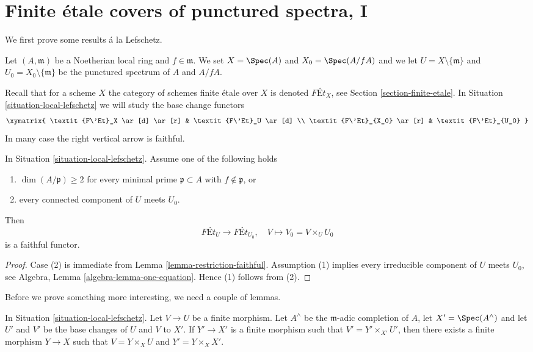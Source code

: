 \section{Finite \'etale covers of punctured spectra, I}
\label{section-pi1-punctured-spec}

\noindent
We first prove some results \'a la Lefschetz.

\begin{situation}
\label{situation-local-lefschetz}
Let $(A, \mathfrak m)$ be a Noetherian local ring and $f \in \mathfrak m$.
We set $X = \Spec(A)$ and $X_0 = \Spec(A/fA)$ and we
let $U = X \setminus \{\mathfrak m\}$ and
$U_0 = X_0 \setminus \{\mathfrak m\}$ be the punctured spectrum of
$A$ and $A/fA$.
\end{situation}

\noindent
Recall that for a scheme $X$ the category of schemes finite
\'etale over $X$ is denoted $\textit{F\'Et}_X$, see
Section \ref{section-finite-etale}.
In Situation \ref{situation-local-lefschetz}
we will study the base change functors
$$
\xymatrix{
\textit{F\'Et}_X \ar[d] \ar[r] & \textit{F\'Et}_U \ar[d] \\
\textit{F\'Et}_{X_0} \ar[r] & \textit{F\'Et}_{U_0}
}
$$
In many case the right vertical arrow is faithful.

\begin{lemma}
\label{lemma-faithful}
In Situation \ref{situation-local-lefschetz}.
Assume one of the following holds
\begin{enumerate}
\item $\dim(A/\mathfrak p) \geq 2$ for every minimal prime
$\mathfrak p \subset A$ with $f \not \in \mathfrak p$, or
\item every connected component of $U$ meets $U_0$.
\end{enumerate}
Then
$$
\textit{F\'Et}_U \longrightarrow \textit{F\'Et}_{U_0},\quad
V \longmapsto V_0 = V \times_U U_0
$$
is a faithful functor.
\end{lemma}

\begin{proof}
Case (2) is immediate from Lemma \ref{lemma-restriction-faithful}.
Assumption (1) implies every irreducible component of $U$ meets $U_0$, see
Algebra, Lemma \ref{algebra-lemma-one-equation}.
Hence (1) follows from (2).
\end{proof}

\noindent
Before we prove something more interesting, we need a couple of lemmas.

\begin{lemma}
\label{lemma-fill-in-missing}
In Situation \ref{situation-local-lefschetz}. Let $V \to U$ be a finite
morphism.  Let $A^\wedge$ be the $\mathfrak m$-adic completion of $A$,
let $X' = \Spec(A^\wedge)$ and let $U'$ and $V'$ be the base changes of
$U$ and $V$ to $X'$. If $Y' \to X'$ is a finite morphism such that
$V' = Y' \times_{X'} U'$, then there exists a finite morphism $Y \to X$
such that $V = Y \times_X U$ and $Y' = Y \times_X X'$.
\end{lemma}

